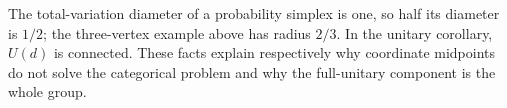 \begin{remark}
The total-variation diameter of a probability simplex is one, so half its diameter is $1/2$; the three-vertex example above has radius $2/3$. In the unitary corollary, $U(d)$ is connected. These facts explain respectively why coordinate midpoints do not solve the categorical problem and why the full-unitary component is the whole group.
\end{remark}
